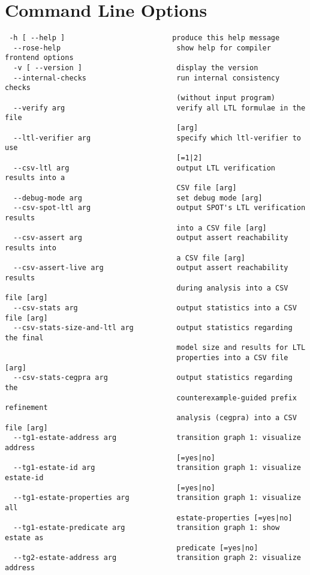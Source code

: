 \documentclass[natbib]{article}
\begin{document}
\section{Command Line Options}
\begin{verbatim}
 -h [ --help ]                         produce this help message
  --rose-help                           show help for compiler frontend options
  -v [ --version ]                      display the version
  --internal-checks                     run internal consistency checks 
                                        (without input program)
  --verify arg                          verify all LTL formulae in the file 
                                        [arg]
  --ltl-verifier arg                    specify which ltl-verifier to use 
                                        [=1|2]
  --csv-ltl arg                         output LTL verification results into a 
                                        CSV file [arg]
  --debug-mode arg                      set debug mode [arg]
  --csv-spot-ltl arg                    output SPOT's LTL verification results 
                                        into a CSV file [arg]
  --csv-assert arg                      output assert reachability results into
                                        a CSV file [arg]
  --csv-assert-live arg                 output assert reachability results 
                                        during analysis into a CSV file [arg]
  --csv-stats arg                       output statistics into a CSV file [arg]
  --csv-stats-size-and-ltl arg          output statistics regarding the final 
                                        model size and results for LTL 
                                        properties into a CSV file [arg]
  --csv-stats-cegpra arg                output statistics regarding the 
                                        counterexample-guided prefix refinement
                                        analysis (cegpra) into a CSV file [arg]
  --tg1-estate-address arg              transition graph 1: visualize address 
                                        [=yes|no]
  --tg1-estate-id arg                   transition graph 1: visualize estate-id
                                        [=yes|no]
  --tg1-estate-properties arg           transition graph 1: visualize all 
                                        estate-properties [=yes|no]
  --tg1-estate-predicate arg            transition graph 1: show estate as 
                                        predicate [=yes|no]
  --tg2-estate-address arg              transition graph 2: visualize address 

\end{verbatim}
\end{document}
